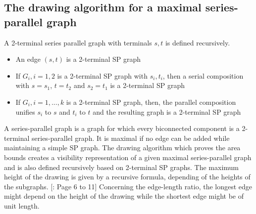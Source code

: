 \subsection{The drawing algorithm for a maximal series-parallel graph}
A 2-terminal series parallel graph with terminals $s,t$ is defined recursively.
\begin{itemize}
	\item An edge $(s,t)$ is a 2-terminal SP graph
	\item If $G_i, i=1,2$ is a 2-terminal SP graph with $s_i, t_i$, then a serial composition with $s = s_1$, $t=t_2$ and $s_2 = t_1$ is a 2-terminal SP graph
	\item If $G_i,i=1,...,k$ is a 2-terminal SP graph, then, the parallel composition unifies $s_i$ to $s$ and $t_i$ to $t$ and the resulting graph is a 2-terminal SP graph
\end{itemize}
A series-parallel graph is a graph for which every biconnected component is a 2-terminal series-parallel graph. It is maximal if no edge can be added while maintaining a simple SP graph.
The drawing algorithm which proves the area bounds creates a visibility representation of a given maximal series-parallel graph and is also defined recursively based on 2-terminal SP graphs. The maximum height of the drawing is given by a recursive formula, depending of the heights of the subgraphs. [\cite{DBLP:journals/dcg/Biedl11}: Page 6 to 11]
Concerning the edge-length ratio, the longest edge might depend on the height of the drawing while the shortest edge might be of unit length.
